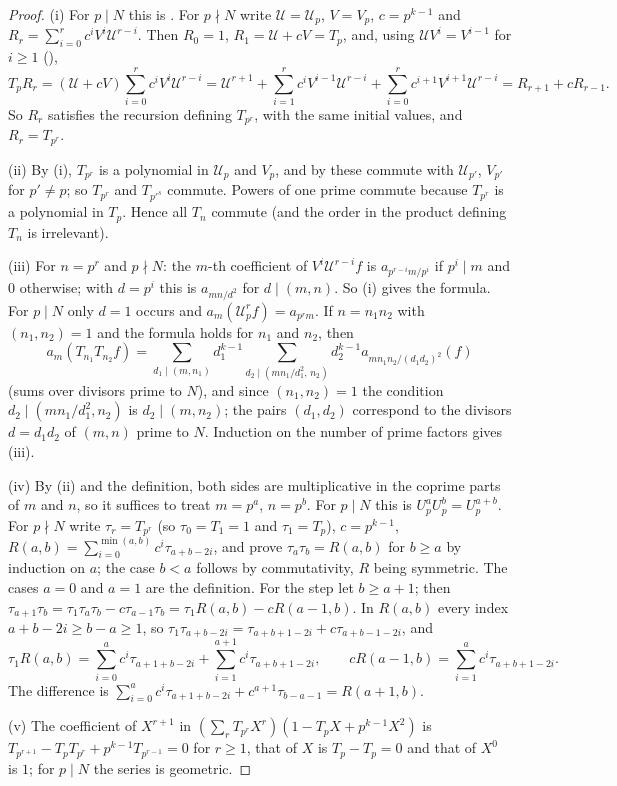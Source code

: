 \begin{proof}
(i) For $p\mid N$ this is . For $p\nmid N$ write $\mathcal U=\mathcal U_p$, $V=V_p$, $c=p^{k-1}$ and $R_r=\sum_{i=0}^rc^iV^i\mathcal U^{r-i}$. Then $R_0=1$,
$R_1=\mathcal U+cV=T_p$, and, using $\mathcal U V^i=V^{i-1}$ for $i\ge1$ (),
\[
T_pR_r=(\mathcal U+cV)\sum_{i=0}^rc^iV^i\mathcal U^{r-i}=\mathcal U^{r+1}+\sum_{i=1}^rc^iV^{i-1}\mathcal U^{r-i}+\sum_{i=0}^rc^{i+1}V^{i+1}\mathcal U^{r-i}=R_{r+1}+cR_{r-1}.
\]
So $R_r$ satisfies the recursion defining $T_{p^r}$, with the same initial values, and $R_r=T_{p^r}$.

(ii) By (i), $T_{p^r}$ is a polynomial in $\mathcal U_p$ and $V_p$, and by  these commute with $\mathcal U_{p'}$, $V_{p'}$ for $p'\ne p$; so $T_{p^r}$ and $T_{p'^s}$ commute.
Powers of one prime commute because $T_{p^r}$ is a polynomial in $T_p$. Hence all $T_n$ commute (and the order in the product defining $T_n$ is irrelevant).

(iii) For $n=p^r$ and $p\nmid N$: the $m$-th coefficient of $V^i\mathcal U^{r-i}f$ is $a_{p^{r-i}m/p^i}$ if $p^i\mid m$ and $0$ otherwise; with $d=p^i$ this is $a_{mn/d^2}$ for $d\mid(m,n)$. So
(i) gives the formula. For $p\mid N$ only $d=1$ occurs and $a_m(\mathcal U_p^rf)=a_{p^rm}$. If $n=n_1n_2$ with $(n_1,n_2)=1$ and the formula holds for $n_1$ and $n_2$, then
\[
a_m(T_{n_1}T_{n_2}f)=\sum_{d_1\mid(m,n_1)}d_1^{k-1}\sum_{d_2\mid(mn_1/d_1^2,\,n_2)}d_2^{k-1}a_{mn_1n_2/(d_1d_2)^2}(f)
\]
(sums over divisors prime to $N$), and since $(n_1,n_2)=1$ the condition $d_2\mid(mn_1/d_1^2,n_2)$ is $d_2\mid(m,n_2)$; the pairs $(d_1,d_2)$ correspond to the divisors $d=d_1d_2$ of $(m,n)$
prime to $N$. Induction on the number of prime factors gives (iii).

(iv) By (ii) and the definition, both sides are multiplicative in the coprime parts of $m$ and $n$, so it suffices to treat $m=p^a$, $n=p^b$. For $p\mid N$ this is
$U_p^aU_p^b=U_p^{a+b}$. For $p\nmid N$ write $\tau_r=T_{p^r}$ (so $\tau_0=T_1=1$ and $\tau_1=T_p$), $c=p^{k-1}$, $R(a,b)=\sum_{i=0}^{\min(a,b)}c^i\tau_{a+b-2i}$, and prove $\tau_a\tau_b=R(a,b)$ for $b\ge a$ by induction on $a$; the case
$b<a$ follows by commutativity, $R$ being symmetric. The cases $a=0$ and $a=1$ are the definition. For the step let $b\ge a+1$; then $\tau_{a+1}\tau_b=\tau_1\tau_a\tau_b-c\tau_{a-1}\tau_b=\tau_1R(a,b)-cR(a-1,b)$.
In $R(a,b)$ every index $a+b-2i\ge b-a\ge1$, so $\tau_1\tau_{a+b-2i}=\tau_{a+b+1-2i}+c\tau_{a+b-1-2i}$, and
\[
\tau_1R(a,b)=\sum_{i=0}^ac^i\tau_{a+1+b-2i}+\sum_{i=1}^{a+1}c^i\tau_{a+b+1-2i},\qquad cR(a-1,b)=\sum_{i=1}^{a}c^i\tau_{a+b+1-2i}.
\]
The difference is $\sum_{i=0}^ac^i\tau_{a+1+b-2i}+c^{a+1}\tau_{b-a-1}=R(a+1,b)$.

(v) The coefficient of $X^{r+1}$ in $(\sum_rT_{p^r}X^r)(1-T_pX+p^{k-1}X^2)$ is $T_{p^{r+1}}-T_pT_{p^r}+p^{k-1}T_{p^{r-1}}=0$ for $r\ge1$, that of $X$ is $T_p-T_p=0$ and that of $X^0$ is $1$; for $p\mid N$
the series is geometric.
\end{proof}

